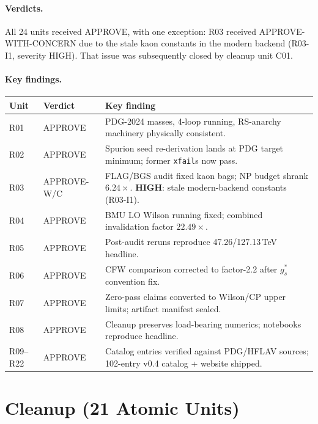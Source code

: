\documentclass[11pt]{article}
\newcommand{\gs}{g_s^*}
\begin{document}
\paragraph{Verdicts.}
All 24 units received APPROVE, with one exception: R03 received
APPROVE-WITH-CONCERN due to the stale kaon constants in the modern
backend (R03-I1, severity HIGH).  That issue was subsequently closed
by cleanup unit C01.

\paragraph{Key findings.}

\begin{center}
\begin{tabular}{@{}llp{7.5cm}@{}}
\toprule
Unit & Verdict & Key finding \\
\midrule
R01 & APPROVE & PDG-2024 masses, 4-loop running, RS-anarchy
  machinery physically consistent. \\
R02 & APPROVE & Spurion seed re-derivation lands at PDG target
  minimum; former \texttt{xfail}s now pass. \\
R03 & APPROVE-W/C & FLAG/BGS audit fixed kaon bags; NP budget
  shrank $6.24\times$. \textbf{HIGH}: stale modern-backend
  constants (R03-I1). \\
R04 & APPROVE & BMU LO Wilson running fixed; combined
  invalidation factor $22.49\times$. \\
R05 & APPROVE & Post-audit reruns reproduce 47.26/127.13\,TeV
  headline. \\
R06 & APPROVE & CFW comparison corrected to factor-2.2 after
  $\gs$ convention fix. \\
R07 & APPROVE & Zero-pass claims converted to Wilson/CP upper
  limits; artifact manifest sealed. \\
R08 & APPROVE & Cleanup preserves load-bearing numerics;
  notebooks reproduce headline. \\
R09--R22 & APPROVE & Catalog entries verified against PDG/HFLAV
  sources; 102-entry v0.4 catalog + website shipped. \\
\bottomrule
\end{tabular}
\end{center}


\section{Cleanup (21 Atomic Units)}
\label{sec:cleanup}
\end{document}
